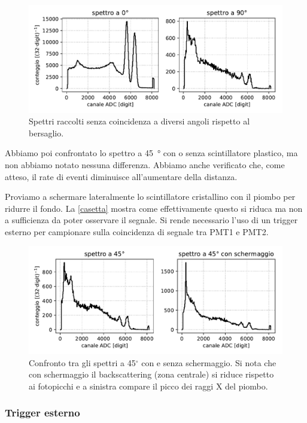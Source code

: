 \begin{figure}[h]
	\centering
	\includegraphics[width=\textwidth]{plotg}
	\caption{Spettri raccolti senza coincidenza a diversi angoli rispetto al bersaglio.}
	\label{4ang}
\end{figure}

Abbiamo poi confrontato lo spettro a \SI{45}{\degree} con o senza scintillatore plastico, ma non abbiamo notato nessuna differenza. Abbiamo anche verificato che, come atteso, il rate di eventi diminuisce all'aumentare della distanza.

Proviamo a schermare lateralmente lo scintillatore cristallino con il piombo per ridurre il fondo.
La \autoref{casetta} mostra come effettivamente questo si riduca ma non a sufficienza da poter osservare il segnale.
Si rende necessario l'uso di un trigger esterno per campionare sulla coincidenza di segnale tra PMT1 e PMT2.

\begin{figure}
	\centering
	\includegraphics[width=\textwidth]{plotcasetta}
	\caption{Confronto tra gli spettri a 45$^{\circ}$ con e senza schermaggio.
	Si nota che con schermaggio il backscattering (zona centrale) si riduce rispetto ai fotopicchi
	e a sinistra compare il picco dei raggi X del piombo.}
	\label{casetta}
\end{figure}

\subsubsection{Trigger esterno}

